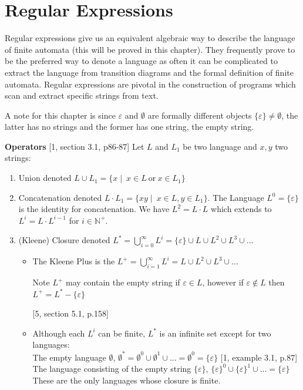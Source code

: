 \documentclass[a4paper,12pt]{report}
\theoremstyle{definition}
\begin{document}
\chapter{Regular Expressions}
Regular expressions give us an equivalent algebraic way to describe the language  of finite automata (this will be proved in this chapter). They frequently prove to be the preferred way to denote a language as often it can be complicated to extract the language from transition diagrams and the formal definition of finite automata. Regular expressions are pivotal in the construction of programs which scan and extract specific strings from text. 

A note for this chapter is since $\varepsilon$ and $\emptyset$ are formally different objects $\{\varepsilon\}\neq\emptyset$, the latter has no strings and the former has one string, the empty string.

\parskip 0.1in \textbf{Operators} [1, section 3.1, p86-87] Let $L$ and $L_1$ be two language and $x,y$ two strings:
\begin{enumerate}
    \item Union denoted $L\cup L_1=\{x\mid \ x\in L \ \text{or} \  x\in L_1\} $
    \item Concatenation denoted $L \cdot L_1=\{xy\mid\ x\in L, y\in L_1\}$. The Language $L^0=\{\varepsilon\}$ is the identity for concatenation. We have $L^2=L\cdot L$ which extends to $L^i=L\cdot L^{i-1}$ for $i\in\mathbb{N}^+$.
    \item (Kleene) Closure denoted
    $L^*=\bigcup\limits_{i=0}^{\infty}L^i=\{\varepsilon\}\cup L\cup L^2 \cup L^3\cup ...$ 
    \begin{itemize}
        \item The Kleene Plus is the $L^+ = \bigcup\limits_{i=1}^{\infty}L^i= L\cup L^2 \cup L^3\cup ...$
        
        Note $L^+$ may contain the empty string if $\varepsilon\in L$, however if $\varepsilon\notin L$ then $L^+=L^*-\{\varepsilon\}$
        
        [5, section 5.1, p.158]
        \item Although each $L^i$ can be finite, $L^*$ is an infinite set except for two languages:\\
        The empty language $\emptyset$, $\emptyset^* = \emptyset^0\cup\emptyset^1\cup...=\emptyset^0=\{\varepsilon\}$
        [1, example 3.1, p.87]\\
        The language consisting of the empty string     $\{\varepsilon\}$, $\{\varepsilon\}^0 \cup\{\varepsilon\}^1\cup...=\{\varepsilon\}$
        \\
        These are the only languages whose closure is finite.
    \end{itemize}
\end{enumerate}
\end{document}
